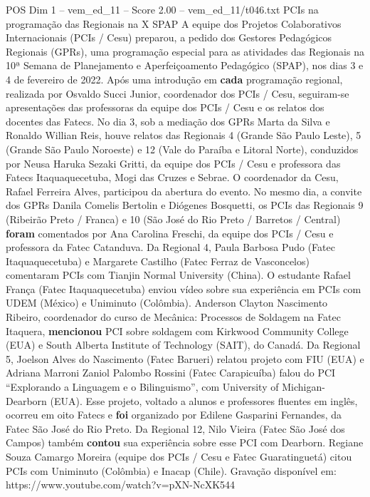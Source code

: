 \begin{textsample}{POS Dim 1 – vem\_ed\_11 – Score 2.00 – vem\_ed\_11/t046.txt}  \label{ex:f1_pos_151}
PCIs na programação das Regionais na X SPAP A equipe dos Projetos Colaborativos Internacionais (PCIs / Cesu) preparou, a pedido dos Gestores Pedagógicos Regionais (GPRs), uma programação especial para as atividades das Regionais na 10ª Semana de Planejamento e Aperfeiçoamento Pedagógico (SPAP), nos dias 3 e 4 de fevereiro de 2022.
Após uma introdução em \textbf{cada} programação regional, realizada por Osvaldo Succi Junior, coordenador dos PCIs / Cesu, seguiram-se apresentações das professoras da equipe dos PCIs / Cesu e os relatos dos docentes das Fatecs.
No dia 3, sob a mediação dos GPRs Marta da Silva e Ronaldo Willian Reis, houve relatos das Regionais 4 (Grande São Paulo Leste), 5 (Grande São Paulo Noroeste) e 12 (Vale do Paraíba e Litoral Norte), conduzidos por Neusa Haruka Sezaki Gritti, da equipe dos PCIs / Cesu e professora das Fatecs Itaquaquecetuba, Mogi das Cruzes e Sebrae.
O coordenador da Cesu, Rafael Ferreira Alves, participou da abertura do evento.
No mesmo dia, a convite dos GPRs Danila Comelis Bertolin e Diógenes Bosquetti, os PCIs das Regionais 9 (Ribeirão Preto / Franca) e 10 (São José do Rio Preto / Barretos / Central) \textbf{foram} comentados por Ana Carolina Freschi, da equipe dos PCIs / Cesu e professora da Fatec Catanduva.
Da Regional 4, Paula Barbosa Pudo (Fatec Itaquaquecetuba) e Margarete Castilho (Fatec Ferraz de Vasconcelos) comentaram PCIs com Tianjin Normal University (China).
O estudante Rafael França (Fatec Itaquaquecetuba) enviou vídeo sobre sua experiência em PCIs com UDEM (México) e Uniminuto (Colômbia).
Anderson Clayton Nascimento Ribeiro, coordenador do curso de Mecânica: Processos de Soldagem na Fatec Itaquera, \textbf{mencionou} PCI sobre soldagem com Kirkwood Community College (EUA) e South Alberta Institute of Technology (SAIT), do Canadá.
Da Regional 5, Joelson Alves do Nascimento (Fatec Barueri) relatou projeto com FIU (EUA) e Adriana Marroni Zaniol Palombo Rossini (Fatec Carapicuíba) falou do PCI “Explorando a Linguagem e o Bilinguismo”, com University of Michigan-Dearborn (EUA).
Esse projeto, voltado a alunos e professores fluentes em inglês, ocorreu em oito Fatecs e \textbf{foi} organizado por Edilene Gasparini Fernandes, da Fatec São José do Rio Preto.
Da Regional 12, Nilo Vieira (Fatec São José dos Campos) também \textbf{contou} sua experiência sobre esse PCI com Dearborn.
Regiane Souza Camargo Moreira (equipe dos PCIs / Cesu e Fatec Guaratinguetá) citou PCIs com Uniminuto (Colômbia) e Inacap (Chile).
Gravação disponível em: https://www.youtube.com/watch?v=pXN-NcXK544

\end{textsample}
